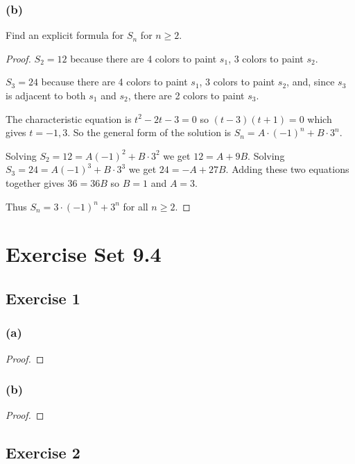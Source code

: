 \documentclass[14pt]{extarticle}
\begin{document}
\subsubsection{(b)}
Find an explicit formula for \(S_n\) for \(n \geq 2\).

\begin{proof}
\(S_2 = 12\) because there are 4 colors to paint \(s_1\), 3 colors to paint \(s_2\).

\(S_3 = 24\) because there are 4 colors to paint \(s_1\), 3 colors to paint \(s_2\), and, since \(s_3\) is adjacent to 
both \(s_1\) and \(s_2\), there are 2 colors to paint \(s_3\).

The characteristic equation is \(t^2 - 2t - 3 = 0\) so \((t-3)(t+1) = 0\) which gives \(t = -1, 3\). So the general
form of the solution is \(S_n = A \cdot (-1)^n + B \cdot 3^n\).

Solving \(S_2 = 12 = A(-1)^2 + B \cdot 3^2\) we get \(12 = A + 9B\). Solving \(S_3 = 24 = A(-1)^3 + B \cdot 3^3\) we get \(24 = -A + 27B\). Adding these two equations together gives \(36 = 36B\) so \(B = 1\) and \(A = 3\). 

Thus \(S_n = 3\cdot(-1)^n + 3^n\) for all \(n \geq 2\).
\end{proof}

\section{Exercise Set 9.4}

\subsection{Exercise 1}

\subsubsection{(a)}

\begin{proof}

\end{proof}

\subsubsection{(b)}

\begin{proof}

\end{proof}

\subsection{Exercise 2}
\end{document}

